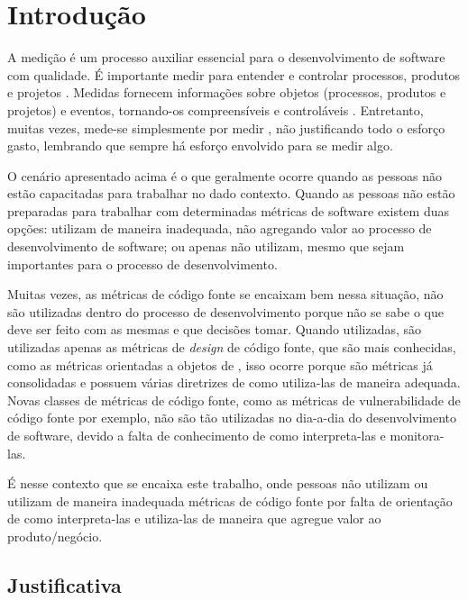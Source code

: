 \chapter{Introdução} \label{cap:introducao}

A medição é um processo auxiliar essencial para o desenvolvimento de software
com qualidade. É importante medir para entender e controlar processos, produtos 
e projetos \cite{ministerio_processo2012}. Medidas fornecem informações sobre 
objetos (processos, produtos e projetos) e eventos, tornando-os compreensíveis 
e controláveis \cite{fenton&pfleenger98}. Entretanto, muitas vezes, mede-se
simplesmente por medir \cite{ministerio_processo2012}, não justificando todo o 
esforço gasto, lembrando que sempre há esforço envolvido para se medir algo.

O cenário apresentado acima é o que geralmente ocorre quando as pessoas não estão
capacitadas para trabalhar no dado contexto. Quando as pessoas não estão
preparadas para trabalhar com determinadas métricas de software existem duas opções:
utilizam de maneira inadequada, não agregando valor ao processo de desenvolvimento
de software; ou apenas não utilizam, mesmo que sejam importantes para o processo de
desenvolvimento.

Muitas vezes, as métricas de código fonte se encaixam bem nessa situação, não são 
utilizadas dentro do processo de desenvolvimento porque não se sabe o que deve ser
feito com as mesmas e que decisões tomar. Quando utilizadas, são utilizadas apenas
as métricas de \textit{design} de código fonte, que são mais conhecidas, como as 
métricas orientadas a objetos de , isso ocorre 
porque são métricas já consolidadas
e possuem várias diretrizes de como utiliza-las de maneira adequada. Novas classes 
de métricas de código fonte, como as métricas de vulnerabilidade de código fonte 
por exemplo, não são tão utilizadas no dia-a-dia do desenvolvimento de software, 
devido a falta de conhecimento de como interpreta-las e monitora-las.

É nesse contexto que se encaixa este trabalho, onde pessoas não utilizam ou utilizam
de maneira inadequada métricas de código fonte por falta de orientação de como 
interpreta-las e utiliza-las de maneira que agregue valor ao produto/negócio.

\section{Justificativa}

